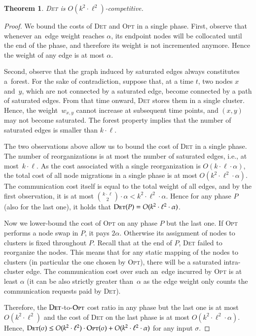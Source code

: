 \documentclass[11pt,a4paper]{scrartcl}
\newtheorem{theorem}{Theorem}
\newcommand{\OPT}{\textsc{Opt}\xspace}
\newcommand{\DET}{\textsc{Det}\xspace}
\begin{document}
\begin{theorem}
\DET is $O(k^2 \cdot \ell^2)$-competitive.
\end{theorem}

\begin{proof}
We bound the costs of \DET and \OPT in a single phase. First, observe that
whenever an~edge weight reaches $\alpha$, its endpoint nodes will be collocated 
until the end of the phase, and therefore its weight is not
incremented anymore. Hence the weight of any edge is at most $\alpha$.

Second, observe that the graph induced by saturated edges always constitutes 
a~forest. For the sake of contradiction, suppose that, at a time $t$,
two nodes $x$ and~$y$, which are not
connected by a saturated edge, become connected by a path of saturated edges.
From that time onward, \DET stores them in a single cluster. Hence, the
weight~$w_{x,y}$ cannot increase at subsequent time points, and $(x,y)$ may
not become saturated. The forest property implies that the number of saturated
edges is smaller than $k \cdot \ell$.

The two observations above allow us to bound the cost of \DET in a single
phase. The number of reorganizations is at most the number of saturated edges,
i.e., at most~$k \cdot \ell$. As the cost associated with a single
reorganization is $O(k \cdot \ell \cdot \alpha)$, the total cost of all node
migrations in a single phase is at most $O(k^2 \cdot \ell^2 \cdot \alpha)$.
The communication cost itself is equal to the total weight of all edges, and
by the first observation, it is at most $\binom{k \cdot \ell}{2}
\cdot \alpha < k^2 \cdot \ell^2 \cdot \alpha$. Hence for any phase $P$ (also
for the last one), it holds that $\DET(P) = O(k^2 \cdot \ell^2 \cdot \alpha)$.

Now we lower-bound the cost of \OPT on any phase $P$ but the last one. If \OPT
performs a node swap in $P$, it pays $2 \alpha$. Otherwise its assignment of
nodes to clusters is fixed throughout $P$. Recall that at the end of $P$, \DET
failed to reorganize the nodes. This means that for any static mapping of the
nodes to clusters (in particular the one chosen by \OPT), there will be a
saturated intra-cluster edge. The communication cost over such an~edge incurred
by \OPT is at least $\alpha$ (it can be also strictly greater than~$\alpha$ as
the edge weight only counts the communication requests paid by \DET).

Therefore, the $\DET$-to-$\OPT$ cost ratio in any phase but the last one is at
most $O(k^2 \cdot \ell^2)$ and the cost of \DET on the last phase is at
most $O(k^2 \cdot \ell^2 \cdot \alpha)$. Hence,
$\DET(\sigma) \leq O(k^2 \cdot \ell^2) \cdot \OPT(\sigma) + O(k^2 \cdot
\ell^2 \cdot \alpha)$ for any input $\sigma$.
\end{proof}
\end{document}
